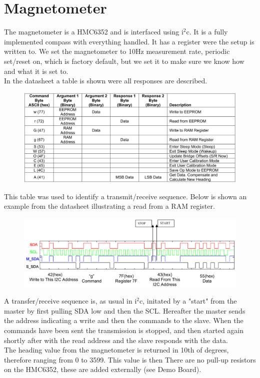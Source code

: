\section{Magnetometer}
The magnetometer is a HMC6352 and is interfaced using i$^2$c. It is a fully implemented compass with everything handled. It has a register were the setup is written to. We set the magnetometer to 10Hz measurement rate, periodic set/reset on, which is factory default, but we set it to make sure we know how and what it is set to.\\
In the datasheet a table is shown were all responses are described.

\begin{figure}[H]
\centering
\includegraphics[width=.9\textwidth]{billeder/HMC6352_responses}
\end{figure}

This table was used to identify a transmit/receive sequence. Below is shown an example from the datasheet illustrating a read from a RAM register.

\begin{figure}[H]
\centering
\includegraphics[width=.8\textwidth]{billeder/HMC6352_example}
\end{figure}

A transfer/receive sequence is, as usual in i$^2$c, initated by a "start" from the master by first pulling SDA low and then the SCL. Hereafter the master sends the address indicating a write and then the commands to the slave. When the commands have been sent the transmission is stopped, and then started again shortly after with the read address and the slave responds with the data.\\
The heading value from the magnetometer is returned in 10th of degrees, therefore ranging from 0 to 3599. This value is then
There are no pull-up resistors on the HMC6352, these are added externally (see Demo Board).\\

